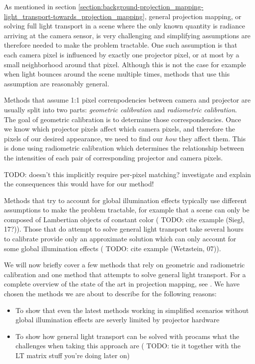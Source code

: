As mentioned in section \ref{section:background-projection_mapping-light_transport-towards_projection_mapping}, general projection mapping, or solving full light transport in a scene where the only known quantity is radiance arriving at the camera sensor, is very challenging and simplifying assumptions are therefore needed to make the problem tractable. One such assumption is that each camera pixel is influenced by exactly one projector pixel, or at most by a small neighborhood around that pixel. Although this is not the case for example when light bounces around the scene multiple times, methods that use this assumption are reasonably general.

Methods that assume 1:1 pixel correnpodencies between camera and projector are usually split into two parts: \textit{geometric calibration} and \textit{radiometric calibration}. The goal of geometric calibration is to determine those correspondencies. Once we know which projector pixels affect which camera pixels, and therefore the pixels of our desired appearance, we need to find our \textit{how} they affect them. This is done using radiometric calibration which determines the relationship between the intensities of each pair of corresponding projector and camera pixels.

{\color{red} TODO: doesn't this implicitly require per-pixel matching? investigate and explain the consequences this would have for our method!}

Methods that try to account for global illumination effects typically use different assumptions to make the problem tractable, for example that a scene can only be composed of Lambertian objects of constant color ({\color{red} TODO: cite example (Siegl, 17?)}). Those that do attempt to solve general light transport take several hours to calibrate provide only an approximate solution which can only account for some global illumination effects ({\color{red} TODO: cite example (Wetzstein, 07)}).

We will now briefly cover a few methods that rely on geometric and radiometric calibration and one method that attempts to solve general light transport. For a complete overview of the state of the art in projection mapping, see \citet{Grundhofer2018}. We have chosen the methods we are about to describe for the following reasons:

\begin{itemize}
    \item To show that even the latest methods working in simplified scenarios without global illumination effects are severly limited by projector hardware
    \item To show how general light transport can be solved with procams what the challenges when taking this approach are ({\color{red} TODO: tie it together with the LT matrix stuff you're doing later on})
\end{itemize}

